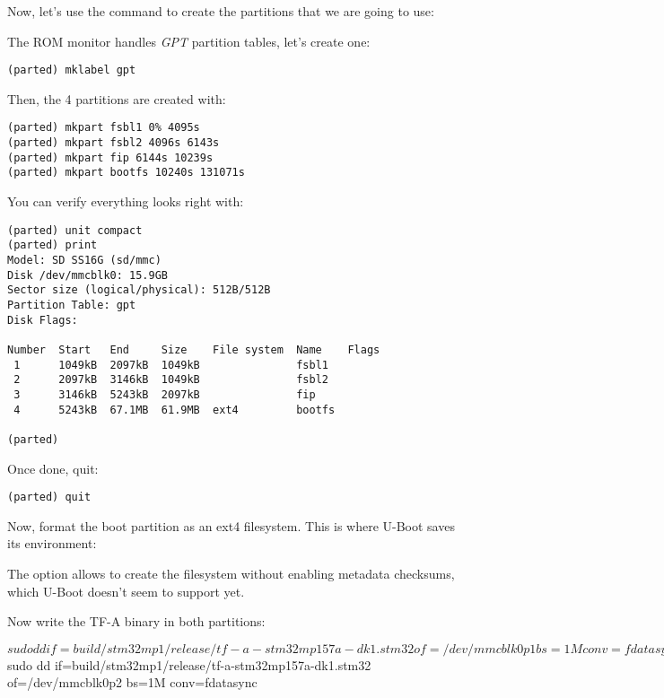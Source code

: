 
Now, let's use the  command to create the partitions that
we are going to use:


The ROM monitor handles {\em GPT} partition tables, let's create one:

\begin{verbatim}
(parted) mklabel gpt
\end{verbatim}

Then, the 4 partitions are created with:
\begin{verbatim}
(parted) mkpart fsbl1 0% 4095s
(parted) mkpart fsbl2 4096s 6143s
(parted) mkpart fip 6144s 10239s
(parted) mkpart bootfs 10240s 131071s
\end{verbatim}

You can verify everything looks right with:

\begin{verbatim}
(parted) unit compact
(parted) print
Model: SD SS16G (sd/mmc)
Disk /dev/mmcblk0: 15.9GB
Sector size (logical/physical): 512B/512B
Partition Table: gpt
Disk Flags:

Number  Start   End     Size    File system  Name    Flags
 1      1049kB  2097kB  1049kB               fsbl1
 2      2097kB  3146kB  1049kB               fsbl2
 3      3146kB  5243kB  2097kB               fip
 4      5243kB  67.1MB  61.9MB  ext4         bootfs

(parted)
\end{verbatim}

Once done, quit:
\begin{verbatim}
(parted) quit
\end{verbatim}

Now, format the boot partition as an ext4 filesystem. This is where
U-Boot saves its environment:

The  option allows to create the filesystem
without enabling metadata checksums, which U-Boot doesn't seem to
support yet.

Now write the TF-A binary in both  partitions:

\begin{bashinput}
$ sudo dd if=build/stm32mp1/release/tf-a-stm32mp157a-dk1.stm32 of=/dev/mmcblk0p1 bs=1M conv=fdatasync
$ sudo dd if=build/stm32mp1/release/tf-a-stm32mp157a-dk1.stm32 of=/dev/mmcblk0p2 bs=1M conv=fdatasync
\end{bashinput}

